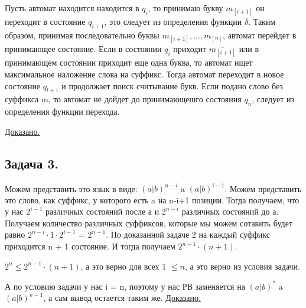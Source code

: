 \documentclass[a4paper,14pt]{article} %
\begin{document}
Пусть автомат находится находится в $q_i$, то принимаю букву $m_{[i+1]}$ он переходит в состояние $q_{i+1}$, это следует из определения функции $\delta$.
Таким образом, принимая последовательно буквы $m_{[i+1]}, ..., m_{[n]}$, автомат перейдет в принимающее состояние.
Если в состоянии $q_i$ приходит $\overline{m_{[i+1]}}$ или в принимающем состоянии приходит еще одна буква, то автомат ищет максимальное наложение слова на суффикс.
Тогда автомат переходит в новое состояние $q_{l+1}$ и продолжает поиск считывание букв. Если подано слово без суффикса m, то автомат не дойдет до принимающешго состояния $q_n$, следует из определения функции перехода.

\underline{Доказано.}

\subsection{Задача 3.}
Можем представить это язык в виде: $(a|b)^{n-i}$ a $(a|b)^{i-1}$.
Можем представить это слово, как суффикс, у которого есть a на n-i+1 позиции. Тогда получаем, что у нас $2^{i-1}$ различных состояний после а и $2^{n-i}$ различных состояний до а.
Получаем количество различных суффиксов, которые мы можем сотавить будет равно $2^{n-i} \cdot 1 \cdot 2^{i-1}$ = $2^{n-1}$. По доказанной задаче 2 на каждый суффикс приходится n + 1 состояние.
И тогда получаем $2^{n- 1} \cdot (n+1)$. 

$2^n \leq  2^{n-1} \cdot (n+1)$, а это верно для всех 1 $\leq n$, а это верно из условия задачи. 

А по условию задачи у нас i = n, поэтому у нас РВ заменяется на $(a|b)^{*}$ a $(a|b)^{n-1}$, а сам вывод остается таким же.
\underline{Доказано.}
\end{document}
